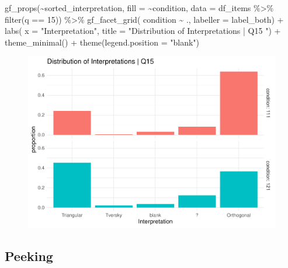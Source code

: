 \documentclass[
  letterpaper,
  DIV=11,
  numbers=noendperiod]{scrreprt}
\newenvironment{Shaded}{\begin{snugshade}}{\end{snugshade}}
\newcommand{\AttributeTok}[1]{\textcolor[rgb]{0.40,0.45,0.13}{#1}}
\newcommand{\DecValTok}[1]{\textcolor[rgb]{0.68,0.00,0.00}{#1}}
\newcommand{\FunctionTok}[1]{\textcolor[rgb]{0.28,0.35,0.67}{#1}}
\newcommand{\NormalTok}[1]{\textcolor[rgb]{0.00,0.23,0.31}{#1}}
\newcommand{\SpecialCharTok}[1]{\textcolor[rgb]{0.37,0.37,0.37}{#1}}
\newcommand{\StringTok}[1]{\textcolor[rgb]{0.13,0.47,0.30}{#1}}
\begin{document}
\begin{Shaded}
\begin{Highlighting}[]
\FunctionTok{gf\_props}\NormalTok{(}\SpecialCharTok{\textasciitilde{}}\NormalTok{sorted\_interpretation, }\AttributeTok{fill =} \SpecialCharTok{\textasciitilde{}}\NormalTok{condition, }\AttributeTok{data =}\NormalTok{ df\_items }\SpecialCharTok{\%\textgreater{}\%} \FunctionTok{filter}\NormalTok{(q }\SpecialCharTok{==} \DecValTok{15}\NormalTok{)) }\SpecialCharTok{\%\textgreater{}\%}
  \FunctionTok{gf\_facet\_grid}\NormalTok{( condition }\SpecialCharTok{\textasciitilde{}}\NormalTok{ ., }\AttributeTok{labeller =}\NormalTok{ label\_both) }\SpecialCharTok{+} 
  \FunctionTok{labs}\NormalTok{( }\AttributeTok{x =} \StringTok{"Interpretation"}\NormalTok{, }\AttributeTok{title =} \StringTok{"Distribution of Interpretations | Q15 "}\NormalTok{) }\SpecialCharTok{+} 
  \FunctionTok{theme\_minimal}\NormalTok{() }\SpecialCharTok{+} \FunctionTok{theme}\NormalTok{(}\AttributeTok{legend.position =} \StringTok{"blank"}\NormalTok{)}
\end{Highlighting}
\end{Shaded}

\begin{figure}[H]

{\centering \includegraphics{analysis/SGC3A/2_sgc3A_scoring_files/figure-pdf/Q15-distribution-2.pdf}

}

\end{figure}

\hypertarget{peeking}{%
\subsection{Peeking}\label{peeking}}
\end{document}
